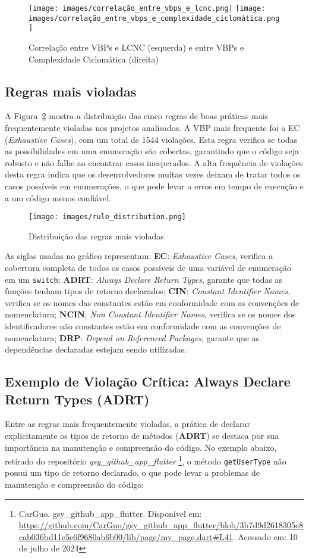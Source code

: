 \documentclass[12pt]{article}
\begin{document}
\begin{figure}[H]
\centering
\texttt{[image: images/correlação\_entre\_vbps\_e\_lcnc.png]}
\texttt{[image: images/correlação\_entre\_vbps\_e\_complexidade\_ciclomática.png]}
\caption{Correlação entre VBPs e LCNC (esquerda) e entre VBPs e Complexidade Ciclomática (direita)}
\label{fig:vbps_vs_lcnc_and_vbps_vs_complexity}
\end{figure}

\subsection{Regras mais violadas}
A Figura~\ref{fig:rule_distribution} mostra a distribuição das cinco regras de boas práticas mais frequentemente violadas nos projetos analisados. A VBP mais frequente foi a EC (\textit{Exhaustive Cases}), com um total de 1544 violações. Esta regra verifica se todas as possibilidades em uma enumeração são cobertas, garantindo que o código seja robusto e não falhe ao encontrar casos inesperados. A alta frequência de violações desta regra indica que os desenvolvedores muitas vezes deixam de tratar todos os casos possíveis em enumerações, o que pode levar a erros em tempo de execução e a um código menos confiável.

\begin{figure}[H]
\centering
\texttt{[image: images/rule\_distribution.png]}
\caption{Distribuição das regras mais violadas}
\label{fig:rule_distribution}
\end{figure}

As siglas usadas no gráfico representam: \textbf{EC}: \textit{Exhaustive Cases}, verifica a cobertura completa de todos os casos possíveis de uma variável de enumeração em um \texttt{switch}; \textbf{ADRT}: \textit{Always Declare Return Types}, garante que todas as funções tenham tipos de retorno declarados; \textbf{CIN}: \textit{Constant Identifier Names}, verifica se os nomes das constantes estão em conformidade com as convenções de nomenclatura; \textbf{NCIN}: \textit{Non Constant Identifier Names}, verifica se os nomes dos identificadores não constantes estão em conformidade com as convenções de nomenclatura; \textbf{DRP}: \textit{Depend on Referenced Packages}, garante que as dependências declaradas estejam sendo utilizadas.

\subsection{Exemplo de Violação Crítica: Always Declare Return Types (ADRT)}
Entre as regras mais frequentemente violadas, a prática de declarar explicitamente os tipos de retorno de métodos (\textbf{ADRT}) se destaca por sua importância na manutenção e compreensão do código. No exemplo abaixo, retirado do repositório \textit{gsy\_github\_app\_flutter} \footnote{CarGuo. gsy\_github\_app\_flutter. Disponível em: \url{https://github.com/CarGuo/gsy\_github_app\_flutter/blob/3b7d9d2618305c8cab036bd11e5e6f9680ab6b00/lib/page/my\_page.dart#L41}. Acessado em: 10 de julho de 2024}, o método \texttt{getUserType}  não possui um tipo de retorno declarado, o que pode levar a problemas de manutenção e compreensão do código:
\end{document}
